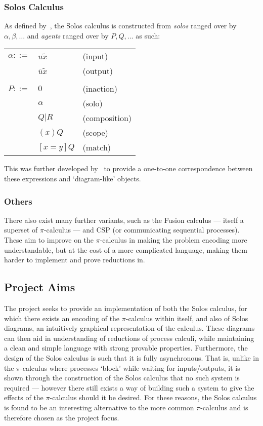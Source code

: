 \documentclass{article}
\begin{document}
\subsubsection{Solos Calculus}
As defined by~\cite{solo-concert}, the Solos calculus is constructed from \textit{solos} ranged over by $\alpha,\beta,\ldots$ and \textit{agents} ranged over by $P,Q,\ldots$ as such:
\begin{center}
	\begin{tabular}{ l l l }
		$\alpha ::=$	& $u\tilde{x}$		& (input) \\
				& $\bar{u}\tilde{x}$	& (output) \\ \\
		$P ::=$		& $0$			& (inaction) \\
				& $\alpha$		& (solo) \\
				& $Q | R$		& (composition) \\
				& $(x)Q$		& (scope) \\
				& $[x=y]Q$		& (match) \\
	\end{tabular}
\end{center}
This was further developed by~\cite{solo-diagrams} to provide a one-to-one correspondence between these  expressions and `diagram-like' objects.

\subsubsection{Others}
There also exist many further variants, such as the Fusion calculus --- itself a superset of $\pi$-calculus --- and CSP (or communicating sequential processes). These aim to improve on the $\pi$-calculus in making the problem encoding more understandable, but at the cost of a more complicated language, making them harder to implement and prove reductions in.


\subsection{Project Aims}
The project seeks to provide an implementation of both the Solos calculus, for which there exists an encoding of the $\pi$-calculus within itself, and also of Solos diagrams, an intuitively graphical representation of the calculus. These diagrams can then aid in understanding of reductions of process calculi, while maintaining a clean and simple language with strong provable properties.
Furthermore, the design of the Solos calculus is such that it is fully asynchronous. That is, unlike in the $\pi$-calculus where processes `block' while waiting for inputs/outputs, it is shown through the construction of the Solos calculus that no such system is required --- however there still exists a way of building such a system to give the effects of the $\pi$-calculus should it be desired.
For these reasons, the Solos calculus is found to be an interesting alternative to the more common $\pi$-calculus and is therefore chosen as the project focus.
\end{document}
